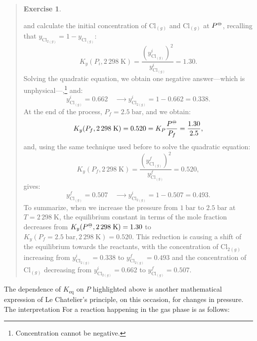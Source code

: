 \documentclass[
  9pt,
]{extbook}
\theoremstyle{definition}
\theoremstyle{definition}
\theoremstyle{definition}
\newtheorem{exercise}{Exercise}[chapter]
\theoremstyle{remark}
\begin{document}
\begin{quote}
\begin{exercise}
\begin{itemize}
  and calculate the initial concentration of \(\mathrm{Cl}_{(g)}\) and \(\mathrm{Cl}_{(g)}\) at \(P^{-\kern-6pt{\ominus}\kern-6pt-}\), recalling that \(y_{\mathrm{Cl}_{2(g)}}=1-y_{\mathrm{Cl}_{(g)}}:\)
  \begin{equation}
  K_y (P_i,2\,298\;\text{K})=\frac{\left(y^i_{\mathrm{Cl}_{(g)}}\right)^2}{y^i_{\mathrm{Cl}_{(g)}}} = 1.30.
  \end{equation}
  Solving the quadratic equation, we obtain one negative answer---which is unphysical---,\footnote{Concentration cannot be negative.} and:
  \begin{equation}
  y_{\mathrm{Cl}_{(g)}}^i= 0.662 \quad \xrightarrow \qquad y_{\mathrm{Cl}_{2(g)}}^i=1-0.662 = 0.338.
  \end{equation}
  At the end of the process, \(P_f=2.5\;\text{bar}\), and we obtain:
  \begin{equation}
  K_y (P_f,2\,298\;\text{K}) = 0.520 = K_P \frac{P^{-\kern-6pt{\ominus}\kern-6pt-}}{P_f} = \frac{1.30}{2.5},
  \end{equation}
  and, using the same technique used before to solve the quadratic equation:
  \begin{equation}
  K_y (P_f,2\,298\;\text{K})=\frac{\left(y^f_{\mathrm{Cl}_{(g)}}\right)^2}{y^f_{\mathrm{Cl}_{(g)}}} = 0.520,
  \end{equation}
  gives:
  \begin{equation}
  y_{\mathrm{Cl}_{(g)}}^f=0.507 \quad \xrightarrow \qquad y_{\mathrm{Cl}_{2(g)}}^i=1-0.507 = 0.493.
  \end{equation}
  To summarize, when we increase the pressure from \(1\;\text{bar}\) to \(2.5\;\text{bar}\) at \(T=2\,298\;\text{K}\), the equilibrium constant in terms of the mole fraction decreases from \(K_y(P^{-\kern-6pt{\ominus}\kern-6pt-},2\,298\;\text{K})=1.30\) to \(K_y(P_f=2.5\;\text{bar},2\,298\;\text{K})=0.520\). This reduction is causing a shift of the equilibrium towards the reactants, with the concentration of \(\text{Cl}_{2(g)}\) increasing from \(y_{\text{Cl}_{2(g)}}^i = 0.338\) to \(y_{\text{Cl}_{2(g)}}^f = 0.493\) and the concentration of \(\text{Cl}_{(g)}\) decreasing from \(y_{\text{Cl}_{2(g)}}^i = 0.662\) to \(y_{\text{Cl}_{(g)}}^f = 0.507\).
\end{itemize}
\end{exercise}
\end{quote}

The dependence of \(K_{\text{eq}}\) on \(P\) highlighted above is another mathematical expression of Le Chatelier's principle, on this occasion, for changes in pressure. The interpretation For a reaction happening in the gas phase is as follows:
\end{document}
